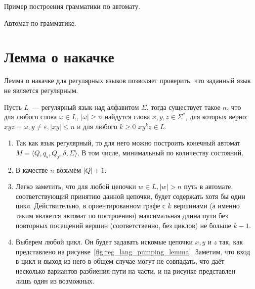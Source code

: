 \begin{example}
Пример построения грамматики по автомату.
\end{example}

\begin{example}
Автомат по грамматике.
\end{example}

\section{Лемма о накачке}

Лемма о накачке для регулярных языков позволяет проверить, что заданный язык не является регулярным.

\begin{lemma}
    Пусть $L$~--- регулярный язык над алфавитом $\Sigma$, тогда существует такое $n$, что для любого слова $\omega \in L$, $|\omega| \geq n$ найдутся слова $x,y,z\in \Sigma^*$, для которых верно: $xyz = \omega, y\neq \varepsilon,|xy|\leq n$ и для любого $k \geq 0$  $xy^kz \in L$.
\end{lemma}

\begin{proofSketch}
    \begin{enumerate}
        \item Так как язык регулярный, то для него можно построить конечный автомат $M = \langle Q, q_s,Q_f, \delta, \Sigma \rangle$.
              В том числе, минимальный по количеству состояний.
        \item В качестве $n$ возьмём $|Q| + 1$.
        \item Легко заметить, что для любой цепочки $w \in L, |w| > n$ путь в автомате, соответствующий принятию данной цепочки, будет содержать хотя бы один цикл.
              Действительно, в ориентированном графе с $k$ вершинами (а именно таким является автомат по построению) максимальная длина пути без повторных посещений вершин (соответственно, без циклов) не больше $k - 1$.
        \item Выберем любой цикл. Он будет задавать искомые цепочки $x, y$ и $z$ так, как представлено на рисунке~\ref{fig:reg_lang_pumping_lemma}.
              Заметим, что вход в цикл и выход из него в общем случае могут не совпадать, что даёт несколько вариантов разбиения пути на части, и на рисунке представлен лишь один из возможных.
              \qedhere
    \end{enumerate}
\end{proofSketch}

